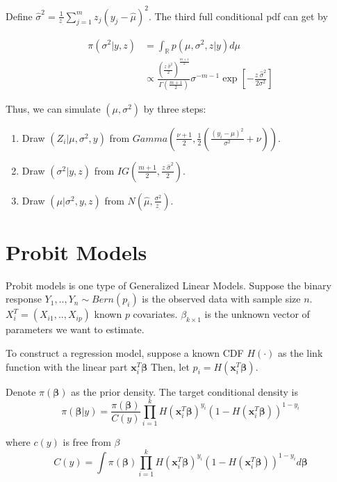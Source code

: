 \documentclass[12pt]{article}
\begin{document}
Define \(\hat\sigma^2=\frac{1}{z_{.}}\sum_{j=1}^mz_j(y_j-\hat\mu)^2\).
The third full conditional pdf can get by

\[\begin{aligned}
\pi(\sigma^2|y,z)&= \int_{\mathbb{R}}p(\mu,\sigma^2,z|y)d\mu\\
               &\propto \frac{(\frac{z_{.}\hat\sigma^2}2)^{\frac{m+1}2}}{\Gamma(\frac{m+1}2)} \sigma^{-m-1}\exp\left[-\frac{z_{.}\hat\sigma^2}{2\sigma^2}\right]
\end{aligned}\]

Thus, we can simulate \((\mu,\sigma^2)\) by three steps:

\begin{enumerate}
\def\labelenumi{\arabic{enumi}.}
\item
  Draw \((Z_i|\mu,\sigma^2,y)\) from
  \(Gamma(\frac{\nu+1}2,\frac{1}2(\frac{(y_i-\mu)^2}{\sigma^2}+\nu))\).
\item
  Draw \((\sigma^2|y,z)\) from
  \(IG(\frac{m+1}2,\frac{z_{.}\hat\sigma^2}2)\).
\item
  Draw \((\mu|\sigma^2,y,z)\) from
  \(N(\hat\mu,\frac{\sigma^2}{z_{.}})\).
\end{enumerate}

\hypertarget{probit-models}{%
\section{Probit Models}\label{probit-models}}

Probit models is one type of Generalized Linear Models. Suppose the
binary response \(Y_1,..,Y_n\sim Bern(p_i)\) is the observed data with
sample size \(n\). \(X_i^T=(X_{i1},..,X_{ip})\) known \(p\) covariates.
\(\beta_{k\times1}\) is the unknown vector of parameters we want to
estimate.

To construct a regression model, suppose a known CDF \(H(\cdot)\) as the
link function with the linear part \(\mathbf{x}_i^T\boldsymbol{\beta}\)
Then, let \(p_i=H(\mathbf{x}_i^T\boldsymbol{\beta})\).

Denote \(\pi(\boldsymbol{\beta})\) as the prior density. The target
conditional density is \[
\pi(\boldsymbol{\beta}|y) = \frac{\pi(\boldsymbol{\beta})}{C(y)}\prod_{i=1}^{k}H (\mathbf{x}_i^T\boldsymbol{\beta})^{y_i}(1-H(\mathbf{x}_i^T\boldsymbol{\beta}))^{1-y_i}
\]

where \(c(y)\) is free from \(\beta\)
\[C(y)=\int\pi(\boldsymbol{\beta})\prod_{i=1}^{k}H (\mathbf{x}_i^T\boldsymbol{\beta})^{y_i}(1-H(\mathbf{x}_i^T\boldsymbol{\beta}))^{1-y_i}d\boldsymbol{\beta}\]
\end{document}
